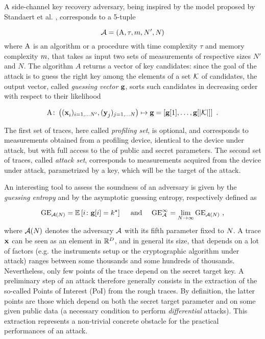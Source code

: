 A side-channel key recovery adversary, being inspired by the model proposed by Standaert et al. \cite{unifiedFramework}, corresponds to a 5-tuple 

\begin{equation}
\adversary = (\attackAlgorithm, \tau, \memComplexity , \numTraces[]', \numTraces[]) \mbox{}
\end{equation}
where $\attackAlgorithm$ is an algorithm or a procedure with time complexity $\tau$ and memory complexity $\memComplexity$, that takes as input two sets of measurements of respective sizes $N'$ and $N$. The algorithm $A$ returns a vector of key candidates: since the goal of the attack is to guess the right key among the elements of a set  $\keySet$  of candidates, the output vector, called {\em guessing vector} $\guessingVector$, sorts such candidates in decreasing order with respect to their likelihood

\begin{equation}
\attackAlgorithm \colon \left( (\sss[]{i})_{i=1,\dots \numTraces[]'}, (\sssTest[]{j})_{j=1,\dots \numTraces[]} \right) \mapsto \guessingVector = \left[\guessingVector[1], \dots, \guessingVector[{\lvert \keySet \rvert}]\right] \mbox{ .}
\end{equation}


The first set of traces, here called {\em profiling set}, is optional, and corresponds to measurements obtained from a profiling device, identical to the device under attack, but with full access to the of public and secret parameters. The second set of traces,  called {\em attack set}, corresponds to measurements acquired from the device under attack, parametrized by a key, which will be the target of the attack.

An interesting tool to assess the soundness of an adversary is given by the {\em guessing entropy} \cite{massey1994guessing} and by the {asymptotic guessing entropy}, respectively defined as

\begin{equation}
\guessingEntropy_{\adversary(\numTraces[])}  = \mathbb{E}\left[i \colon \guessingVector[i] = \keyTest \right] \quad \mbox{ and } \quad \guessingEntropy^\infty_\adversary  = \lim_{\numTraces[]\rightarrow \infty} \guessingEntropy_{\adversary(\numTraces[])} \mbox{ ,}
\end{equation}
where $\adversary(\numTraces[])$ denotes the adversary $\adversary$ with its fifth parameter fixed to $\numTraces[]$.
A trace $\sss[]{}$ can be seen as an element in $\mathbb{R}^\traceLength$, and in general its size, that depends on a lot of factors (e.g. the instruments setup or the cryptographic algorithm under attack) ranges between some thousands and some hundreds of thousands. Nevertheless, only few points of the trace depend on the secret target key. A preliminary step of an attack therefore generally consists in the extraction of the so-called {Points of Interest (PoI)} from the  rough traces. By definition, the latter points are those which depend on both the secret target parameter and on some given public data (a necessary condition to perform {\em differential} attacks). This extraction represents a non-trivial concrete obstacle for the practical performances of an attack.

